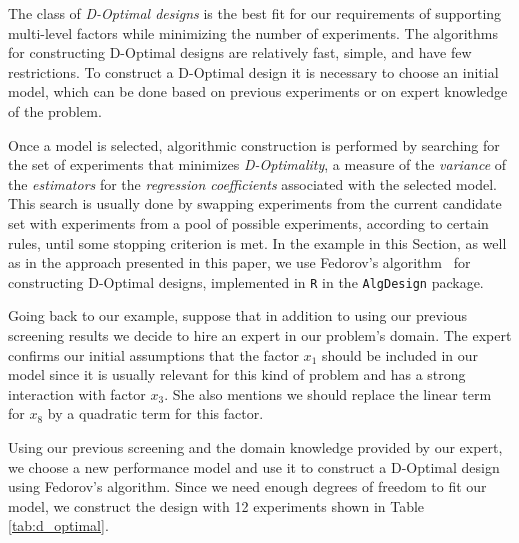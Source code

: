 \documentclass[conference]{IEEEtran}
\begin{document}
The class of \emph{D-Optimal designs} is the best fit for our requirements of
supporting multi-level factors while minimizing the number of experiments. The
algorithms for constructing D-Optimal designs are relatively fast, simple, and
have few restrictions. To construct a D-Optimal design it is necessary to choose
an initial model, which can be done based on previous experiments or on expert
knowledge of the problem.

Once a model is selected, algorithmic construction is performed by searching for
the set of experiments that minimizes \emph{D-Optimality}, a measure of the
\emph{variance} of the \emph{estimators} for the \emph{regression coefficients} associated with
the selected model. This search is usually done by swapping experiments from the
current candidate set with experiments from a pool of possible experiments,
according to certain rules, until some stopping criterion is met. In the example
in this Section, as well as in the approach presented in this paper, we use
Fedorov's algorithm~\cite{fedorov1972theory} for constructing D-Optimal
designs, implemented in \texttt{R} in the \texttt{AlgDesign} package.

Going back to our example, suppose that in addition to using our previous
screening results we decide to hire an expert in our problem's domain. The
expert confirms our initial assumptions that the factor \(x_1\) should be included
in our model since it is usually relevant for this kind of problem and has a
strong interaction with factor \(x_3\). She also mentions we should replace
the linear term for \(x_8\) by a quadratic term for this factor.

Using our previous screening and the domain knowledge provided by our expert, we
choose a new performance model and use it to construct a D-Optimal design using
Fedorov's algorithm. Since we need enough degrees of freedom to fit our model,
we construct the design with 12 experiments shown in Table \ref{tab:d_optimal}.
\end{document}
